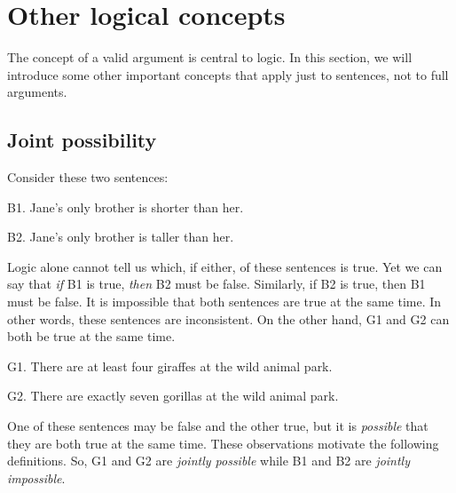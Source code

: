 \chapter{Other logical concepts}\label{s:BasicNotions}

The concept of a valid argument is central to logic. In this section, we will introduce some other important concepts that apply just to sentences, not to full arguments. 


\section{Joint possibility}\label{s:joint-poss}

Consider these two sentences:
	\begin{ebullet}
		\item[B1.] Jane's only brother is shorter than her.
		\item[B2.] Jane's only brother is taller than her.
	\end{ebullet}
Logic alone cannot tell us which, if either, of these sentences is true. Yet we can say that \emph{if} B1 is true, \emph{then} B2 must be false. Similarly, if B2 is true, then B1 must be false. It is impossible that both sentences are true at the same time. In other words, these sentences are inconsistent. On the other hand, G1 and G2 can both be true at the same time.
	\begin{ebullet}	
		\item[G1.] \label{MartianGiraffes} There are at least four giraffes at the wild animal park.
		\item[G2.] There are exactly seven gorillas at the wild animal park.
	\end{ebullet}
One of these sentences may be false and the other true, but it  is \textit{possible} that they are both true at the same time. These observations motivate the following definitions.
\noindent So, G1 and G2 are \textit{jointly possible} while B1 and B2 are \emph{jointly impossible}.

